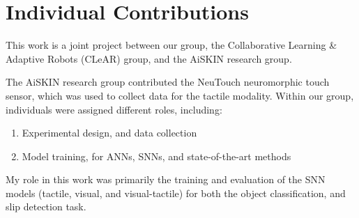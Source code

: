 \documentclass[fyp]{socreport}
\begin{document}
\section{Individual Contributions}
This work is a joint project between our group, the Collaborative Learning \&
Adaptive Robots (CLeAR) group, and the AiSKIN research group.

The AiSKIN research group contributed the NeuTouch neuromorphic touch sensor,
which was used to collect data for the tactile modality. Within our group,
individuals were assigned different roles, including:

\begin{enumerate}
  \item Experimental design, and data collection
  \item Model training, for ANNs, SNNs, and state-of-the-art methods
\end{enumerate}

My role in this work was primarily the training and evaluation of the SNN models (tactile, visual, and visual-tactile) for both the object classification, and slip detection task.



\appendix
\end{document}
